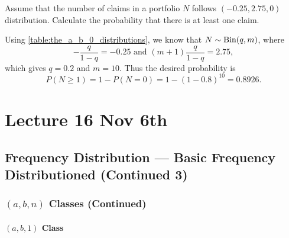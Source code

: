 \documentclass[notoc,notitlepage]{tufte-book}
\begin{document}
\begin{eg}
  Assume that the number of claims in a portfolio $N$ follows $(-0.25, 2.75, 0)$ distribution. Calculate the probability that there is at least one claim.
\end{eg}

\begin{solution}
  Using \cref{table:the_a_b_0_distributions}, we know that $N \sim \operatorname{Bin}(q, m)$, where
  \begin{equation*}
    - \frac{q}{1 - q} = - 0.25 \text{ and } (m + 1) \frac{q}{1 - q} = 2.75,
  \end{equation*}
  which gives $q = 0.2$ and $m = 10$. Thus the desired probability is
  \begin{equation*}
    P(N \geq 1) = 1 - P(N = 0) = 1 - (1 - 0.8)^{10} = 0.8926.
  \end{equation*}
\end{solution}





\chapter{Lecture 16 Nov 6th}%
\label{chp:lecture_16_nov_6th}

\section{Frequency Distribution --- Basic Frequency Distributioned (Continued 3)}%
\label{sec:frequency_distribution_basic_frequency_distributioned_continued_3}

\subsection{$(a, b, n)$ Classes (Continued)}%
\label{sub:a_b_n_classes_continued}

\subsubsection{$(a, b, 1)$ Class}%
\label{ssub:_a_b_1_class}
\end{document}
